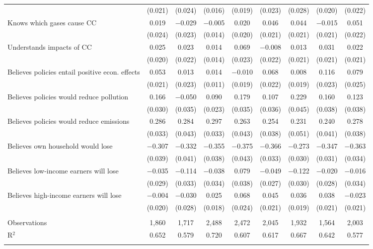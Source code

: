 \begin{tabular}{@{\extracolsep{5pt}}lcccccccc}
  & (0.021) & (0.024) & (0.016) & (0.019) & (0.023) & (0.028) & (0.020) & (0.022) \\ 
  Knows which gases cause CC & 0.019 & $-$0.029 & $-$0.005 & 0.020 & 0.046 & 0.044 & $-$0.015 & 0.051 \\ 
  & (0.024) & (0.023) & (0.014) & (0.020) & (0.021) & (0.021) & (0.021) & (0.022) \\ 
  Understands impacts of CC & 0.025 & 0.023 & 0.014 & 0.069 & $-$0.008 & 0.013 & 0.031 & 0.022 \\ 
  & (0.020) & (0.022) & (0.014) & (0.023) & (0.022) & (0.021) & (0.021) & (0.021) \\ 
  Believes policies entail positive econ. effects & 0.053 & 0.013 & 0.014 & $-$0.010 & 0.068 & 0.008 & 0.116 & 0.079 \\ 
  & (0.021) & (0.023) & (0.011) & (0.019) & (0.022) & (0.019) & (0.023) & (0.025) \\ 
  Believes policies would reduce pollution & 0.166 & $-$0.050 & 0.090 & 0.179 & 0.107 & 0.229 & 0.160 & 0.123 \\ 
  & (0.030) & (0.035) & (0.023) & (0.035) & (0.036) & (0.045) & (0.038) & (0.038) \\ 
  Believes policies would reduce emissions & 0.286 & 0.284 & 0.297 & 0.263 & 0.254 & 0.231 & 0.240 & 0.278 \\ 
  & (0.033) & (0.043) & (0.033) & (0.043) & (0.038) & (0.051) & (0.041) & (0.038) \\ 
  Believes own household would lose & $-$0.307 & $-$0.332 & $-$0.355 & $-$0.375 & $-$0.366 & $-$0.273 & $-$0.347 & $-$0.363 \\ 
  & (0.039) & (0.041) & (0.038) & (0.043) & (0.033) & (0.030) & (0.031) & (0.034) \\ 
  Believes low-income earners will lose & $-$0.035 & $-$0.114 & $-$0.038 & 0.079 & $-$0.049 & $-$0.122 & $-$0.020 & $-$0.016 \\ 
  & (0.029) & (0.033) & (0.034) & (0.038) & (0.027) & (0.030) & (0.028) & (0.034) \\ 
  Believes high-income earners will lose & $-$0.004 & $-$0.030 & 0.025 & 0.068 & 0.045 & 0.036 & 0.038 & $-$0.023 \\ 
  & (0.020) & (0.028) & (0.018) & (0.024) & (0.021) & (0.019) & (0.021) & (0.021) \\ 
 \hline \\[-1.8ex] 

Observations & 1,860 & 1,717 & 2,488 & 2,472 & 2,045 & 1,932 & 1,564 & 2,003 \\ 
R$^{2}$ & 0.652 & 0.579 & 0.720 & 0.607 & 0.617 & 0.667 & 0.642 & 0.577 \\ 
\hline 
\hline \\[-1.8ex] 
\end{tabular} 